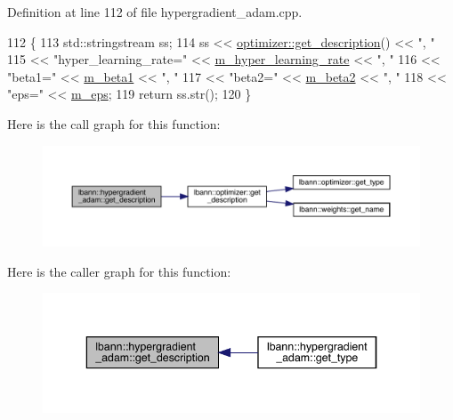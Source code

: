 Definition at line 112 of file hypergradient\+\_\+adam.\+cpp.


\begin{DoxyCode}
112                                                     \{
113   std::stringstream ss;
114   ss << \hyperlink{classlbann_1_1optimizer_a66bb8d28dfb41452ac1a75a3efd47723}{optimizer::get\_description}() << \textcolor{stringliteral}{", "}
115      << \textcolor{stringliteral}{"hyper\_learning\_rate="} << \hyperlink{classlbann_1_1hypergradient__adam_a1066721ebaadb4eed2554b159510ae44}{m\_hyper\_learning\_rate} << \textcolor{stringliteral}{", "}
116      << \textcolor{stringliteral}{"beta1="} << \hyperlink{classlbann_1_1hypergradient__adam_a876a8bc1ee9a47479008d204048724e7}{m\_beta1} << \textcolor{stringliteral}{", "}
117      << \textcolor{stringliteral}{"beta2="} << \hyperlink{classlbann_1_1hypergradient__adam_a0effe7359fa37f02a40f059281580760}{m\_beta2} << \textcolor{stringliteral}{", "}
118      << \textcolor{stringliteral}{"eps="} << \hyperlink{classlbann_1_1hypergradient__adam_a5bae9101fcc235d961ae7713706f4ff7}{m\_eps};
119   \textcolor{keywordflow}{return} ss.str();
120 \}
\end{DoxyCode}
Here is the call graph for this function\+:\nopagebreak
\begin{figure}[H]
\begin{center}
\leavevmode
\includegraphics[width=350pt]{classlbann_1_1hypergradient__adam_aadcd02daeca55493b0e7210195ddb6ec_cgraph}
\end{center}
\end{figure}
Here is the caller graph for this function\+:\nopagebreak
\begin{figure}[H]
\begin{center}
\leavevmode
\includegraphics[width=343pt]{classlbann_1_1hypergradient__adam_aadcd02daeca55493b0e7210195ddb6ec_icgraph}
\end{center}
\end{figure}
\mbox{\label{classlbann_1_1hypergradient__adam_a21ba2e54a7c803c10ab8354d0552ba82}} 

